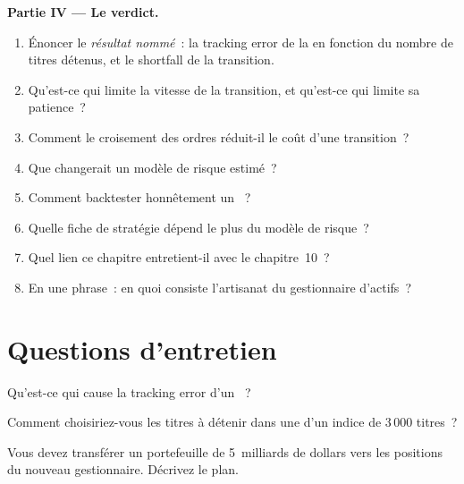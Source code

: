 \begin{problem}
\medskip\noindent\textbf{Partie IV --- Le verdict.}
\begin{enumerate}[resume]
\item Énoncer le \emph{résultat nommé}~: la tracking error de la  en fonction du nombre de titres détenus, et le shortfall de la transition.
\item Qu'est-ce qui limite la vitesse de la transition, et qu'est-ce qui limite sa patience~?
\item Comment le croisement des ordres réduit-il le coût d'une transition~?
\item Que changerait un modèle de risque estimé~?
\item Comment backtester honnêtement un ~?
\item Quelle fiche de stratégie dépend le plus du modèle de risque~?
\item Quel lien ce chapitre entretient-il avec le chapitre~10~?
\item En une phrase~: en quoi consiste l'artisanat du gestionnaire d'actifs~?
\end{enumerate}
\end{problem}

\section{Questions d'entretien}

\begin{interviewq}\label{iq:s1:the-asset-managers-strategies:1}
Qu'est-ce qui cause la tracking error d'un ~?
\end{interviewq}

\begin{interviewq}\label{iq:s1:the-asset-managers-strategies:2}
Comment choisiriez-vous les titres à détenir dans une  d'un indice de 3\,000 titres~?
\end{interviewq}

\begin{interviewq}\label{iq:s1:the-asset-managers-strategies:3}
Vous devez transférer un portefeuille de 5~milliards de dollars vers les positions du nouveau gestionnaire. Décrivez le plan.
\end{interviewq}

